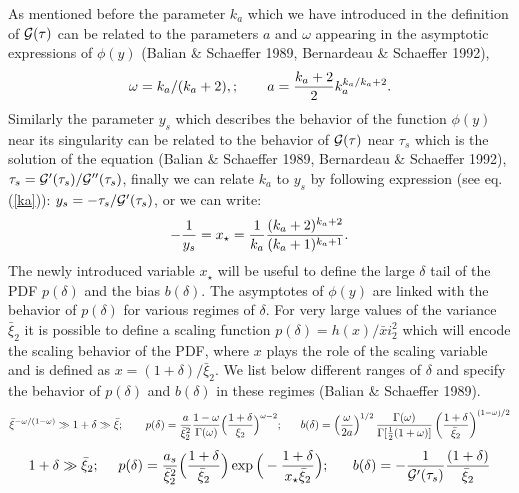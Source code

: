 \documentclass[usenatbib]{mn2e}
\def\be{\begin{equation}}
\def\ee{\end{equation}}
\def\be{\begin{equation}}
\def\ee{\end{equation}}
\begin{document}
%
As mentioned before the parameter $k_a$ which we have introduced in
the definition of
${\cal G}(\tau)$ can be related to the parameters $a$ and $\omega$ appearing 
in the asymptotic expressions of $\phi(y)$ (Balian \& Schaeffer 1989, 
Bernardeau \& Schaeffer 1992),
\be
\omega = k_a / ( k_a + 2),\label{ka}; \quad\quad
a = {k_a + 2 \over 2} k_a^{ k_a /  k_a + 2}.
\ee
Similarly the parameter $y_s$ which describes the behavior
of the function $\phi(y)$ near its singularity can be 
related to the behavior of
${\cal G(\tau)}$ near $\tau_s$ which is the solution of the equation
(Balian \& Schaeffer 1989, Bernardeau \& Schaeffer 1992),
$\tau_s = {{\cal G}'(\tau_s)/ {\cal G}''(\tau_s) }$,
finally we can relate $k_a$ to $y_s$ by following expression (see eq. (\ref{ka})):
$y_s = - { \tau_s / {\cal G}'(\tau_s)}$, or we can write:
\begin{equation}
-{ 1 \over y_s} = x_{\star} = {1 \over k_a } { (k_a + 2)^{k_a + 2} \over (k_a + 1)^{k_a+1}}.
\end{equation}
The newly introduced variable $x_\star$ will be useful to define the
large $\delta$ tail of the PDF $p(\delta)$ and the bias $b(\delta)$. 
The asymptotes of $\phi(y)$
are linked with the behavior of $p(\delta)$ for various regimes of
$\delta$. For very large values of the variance $\bar\xi_2$ 
it is possible to define a scaling function $p(\delta) = { h(x)/\bar xi_2^2
} $  which will encode 
the scaling behavior of the PDF, where $x$ plays the role of the scaling 
variable and is defined as $x={(1 + \delta)}/\bar \xi_2$. We list below
different ranges of $\delta$ and specify the behavior of $p(\delta)$
and $b(\delta)$ in these regimes (Balian \& Schaeffer 1989).
\begin{equation}
{\bar \xi }^{ - \omega/( 1 - \omega)} \gg 1 + \delta \gg \bar \xi;
~~~~~~
p(\delta) = { a \over \bar \xi_2^2} { 1- \omega \over \Gamma(\omega)}
\Big ( { 1 + \delta \over \xi_2 } \Big )^{\omega - 2}; ~~~~~
 b(\delta) = \left ( {\omega \over 2a } \right )^{1/2} { \Gamma
(\omega) \over \Gamma [ { 1\over 2} ( 1 + \omega ) ] } \left( { 1 +
\delta \over \bar \xi_2} \right)^{(1 - \omega)/2}
\end{equation}
\begin{equation}
1+ \delta \gg {\bar \xi}_2; ~~~~
p(\delta) = { a_s \over \bar \xi_2^2 } \Big ( { 1 + \delta \over \bar
\xi_2}  \Big ) \exp \Big ( - { 1 + \delta \over x_{\star} \bar \xi_2}
\Big );  ~~~~~ b(\delta) = -{ 1 \over {\cal G}'(\tau_s)} {(1 + \delta)
\over { {\bar \xi}_2}} 
\label{eq:bias}
\end{equation}
\end{document}
